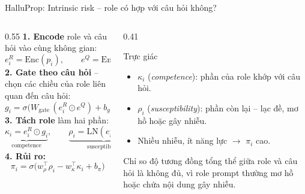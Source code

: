 \documentclass[aspectratio=169,10pt]{beamer}
\begin{document}
\begin{frame}{HalluProp: Intrinsic risk -- role có hợp với câu hỏi không?}
  \small
  \begin{columns}[T]
    \begin{column}{0.55\textwidth}
      \textbf{1. Encode} role và câu hỏi vào cùng không gian:
      \[ e^R_i = \mathrm{Enc}(p_i), \qquad e^Q = \mathrm{Enc}(q) \]
      \textbf{2. Gate theo câu hỏi} -- chọn các chiều của role liên quan đến câu hỏi:
      \[ g_i = \sigma\bigl(W_{\text{gate}}\,(e^R_i \odot e^Q) + b_g\bigr) \]
      \textbf{3. Tách role} làm hai phần:
      \[ \underbrace{\kappa_i = e^R_i \odot g_i}_{\text{competence}}, \qquad
         \underbrace{\rho_i = \mathrm{LN}(e^R_i - \kappa_i)}_{\text{susceptibility}} \]
      \textbf{4. Rủi ro:}
      \[ \pi_i = \sigma\bigl(w_\rho^\top \rho_i - w_\kappa^\top \kappa_i + b_\pi\bigr) \]
    \end{column}
    \begin{column}{0.41\textwidth}
      \begin{block}{Trực giác}
        \begin{itemize}
          \item $\kappa_i$ (\emph{competence}): phần của role khớp với câu hỏi.
          \item $\rho_i$ (\emph{susceptibility}): phần còn lại -- lạc đề, mơ hồ hoặc gây nhiễu.
          \item Nhiều nhiễu, ít năng lực $\to$ $\pi_i$ cao.
        \end{itemize}
      \end{block}
      {\footnotesize Chỉ so độ tương đồng tổng thể giữa role và câu hỏi là không đủ,
      vì role prompt thường mơ hồ hoặc chứa nội dung gây nhiễu.}
    \end{column}
  \end{columns}
\end{frame}
\end{document}
